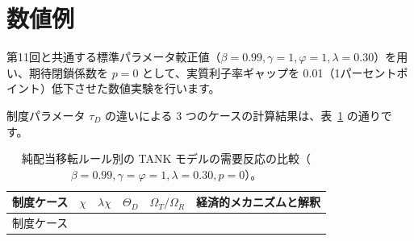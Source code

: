 \documentclass[
  japanese,
  lualatex,
  ja=standard,
  12pt,
  a4paper]{ltjsarticle}
\begin{document}

\section{数値例}\label{ux6570ux5024ux4f8b}

第11回と共通する標準パラメータ較正値（\(\beta=0.99, \gamma=1, \varphi=1, \lambda=0.30\)）を用い、期待閉鎖係数を
\(p=0\) として、実質利子率ギャップを
0.01（1パーセントポイント）低下させた数値実験を行います。

制度パラメータ \(\tau_D\) の違いによる 3
つのケースの計算結果は、表~\ref{tbl-lecture12-numerical-cases}
の通りです。

\begin{longtable}[]{@{}
  >{\raggedleft\arraybackslash}p{}
  >{\raggedleft\arraybackslash}p{}
  >{\raggedleft\arraybackslash}p{}
  >{\raggedleft\arraybackslash}p{}
  >{\raggedleft\arraybackslash}p{}
  >{\raggedright\arraybackslash}p{}@{}}
\caption{純配当移転ルール別の TANK
モデルの需要反応の比較（\(\beta=0.99, \gamma=\varphi=1, \lambda=0.30, p=0\)）。}\label{tbl-lecture12-numerical-cases}\tabularnewline
\toprule\noalign{}
\begin{minipage}[b]{\linewidth}\raggedleft
制度ケース
\end{minipage} & \begin{minipage}[b]{\linewidth}\raggedleft
\(\chi\)
\end{minipage} & \begin{minipage}[b]{\linewidth}\raggedleft
\(\lambda\chi\)
\end{minipage} & \begin{minipage}[b]{\linewidth}\raggedleft
\(\Theta_D\)
\end{minipage} & \begin{minipage}[b]{\linewidth}\raggedleft
\(\Omega_T / \Omega_R\)
\end{minipage} & \begin{minipage}[b]{\linewidth}\raggedright
経済的メカニズムと解釈
\end{minipage} \\
\midrule\noalign{}
\endfirsthead
\toprule\noalign{}
\begin{minipage}[b]{\linewidth}\raggedleft
制度ケース
\end{minipage} & \begin{minipage}[b]{\linewidth}\raggedleft

\end{minipage}
\end{longtable}
\end{document}

